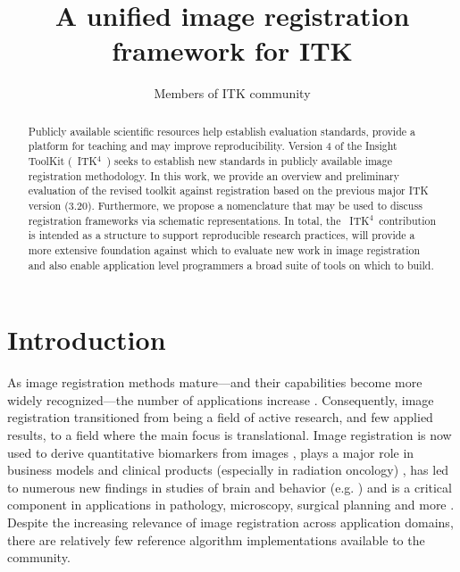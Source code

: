 \documentclass{llncs}
\newcommand{\tk}{~ITK$^{\text{4}}$~}
\begin{document}
\vspace{-0.1in}
\title{A unified image registration framework for ITK}
\author{Members of ITK community}
\maketitle              
\begin{abstract}
Publicly available scientific resources help establish evaluation
standards, provide a platform for teaching and may improve reproducibility.
Version 4 of the Insight ToolKit (\tk) seeks to establish new
standards in publicly available image registration methodology.  In this
work, we provide an overview and preliminary evaluation of the revised
toolkit against registration based on the previous major ITK version
(3.20).  Furthermore, we propose a nomenclature that may be used to
discuss registration frameworks via schematic representations.  In
total, the \tk contribution is intended as a structure to support
reproducible research practices, will provide a more extensive
foundation against which to evaluate new work in image registration
and also enable application level programmers a broad suite of tools
on which to build.
\end{abstract}

\section{Introduction}
As image registration methods mature---and their capabilities become
more widely recognized---the number of applications increase
\cite{Rueckert1999,2004,Shelton2005,Miller2005,Chen2008,Cheung2009,Baloch2009,Peyrat2010,Metz2011,Kikinis2011,Fedorov2011,Murphy2011}.
Consequently, image registration transitioned from being a field of active research, and few applied results, to a
field where the main focus is translational.  Image registration is
now used to derive quantitative biomarkers from images
\cite{Jack2010a}, plays a major role in business models and clinical
products (especially in radiation oncology) \cite{Cheung2009}, has led
to numerous new findings in studies of brain and behavior (e.g. \cite{Bearden2007}) and is a critical component in applications in
pathology, microscopy, surgical planning and more
\cite{Shelton2005,Miller2005,Floca2007,Chen2008,Cheung2009,Peyrat2010,Kikinis2011,Murphy2011}.
Despite the increasing relevance of image registration across
application domains, there are relatively few reference algorithm
implementations available to the community.
\end{document}
